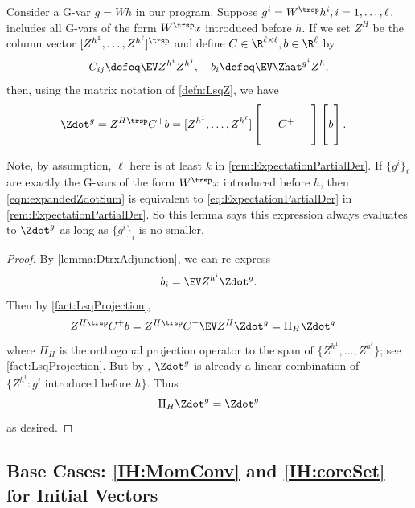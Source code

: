 \documentclass[main.tex]{subfiles}
\begin{document}
\begin{lemma}\label{lemma:conjugatePairDtrxh}
  Consider a G-var $g = Wh$ in our program.
  Suppose $g^i = W^\trsp h^i, i=1,\ldots,\ell$, includes all G-vars of the form $W^\trsp x$ introduced before $h$.
  If we set $ Z^{H}$ be the column vector $[Z^{h^1},
  \ldots,
  Z^{h^\ell}]^\trsp$ and define $C \in\R^{\ell\times \ell}, b \in \R^\ell$ by
  \[C_{ij} \defeq \EV Z^{h^i} Z^{h^j},\quad b_i \defeq \EV \Zhat^{g^i} Z^h,\]
  then, using the matrix notation of \cref{defn:LsqZ}, we have
  \begin{align}
  \Zdot^{g} &= 
     Z^{H}{}^\trsp C^+ b =
  [Z^{h^1},
  \ldots,
   Z^{h^\ell}]
  \begin{bmatrix}
  \phz
    &\phz
      &\phz\\
  \phz
    &C^+
      &\phz\\
  \phz
    &\phz
      &\phz
  \end{bmatrix}
  \begin{bmatrix}
  \phz\\
  b\\
  \phz
  \end{bmatrix}
  \label{eqn:expandedZdotSum}
  .
  \end{align}
\end{lemma}
Note, by assumption, $\ell$ here is at least $k$ in \cref{rem:ExpectationPartialDer}.
If $\{g^i\}_i$ are exactly the G-vars of the form $W^\trsp x$ introduced before $h$, then \cref{eqn:expandedZdotSum} is equivalent to \cref{eq:ExpectationPartialDer} in \cref{rem:ExpectationPartialDer}.
So this lemma says this expression always evaluates to $\Zdot^g$ as long as $\{g^i\}_i$ is no smaller.
\begin{proof}
  By \cref{lemma:DtrxAdjunction}, we can re-express
  \[b_i = \EV   Z^{h^i} \Zdot^{g}.\]
  Then by \cref{fact:LsqProjection},
  \begin{align*}
  Z^{H\trsp } C^+ b
    &=
      Z^{H}{}^\trsp C^+ \EV Z^{H} \Zdot^{g}
    =
      \Pi_H \Zdot^{g}
  \end{align*}
  where $\Pi_H$ is the orthogonal projection operator to the span of $\{ Z^{h^1},
  \ldots,
  Z^{h^\ell}\}$; see \cref{fact:LsqProjection}.
  But by , $\Zdot^{g}$ is already a linear combination of $\{Z^{h^i}: g^i\text{ introduced before $h$}\}$.
  Thus
  \[ \Pi_H \Zdot^{g} = \Zdot^{g}\]
  as desired.
\end{proof}

\subsection{Base Cases: \ref{IH:MomConv} and \ref{IH:coreSet} for Initial Vectors}
\label{sec:basecases}
\end{document}
